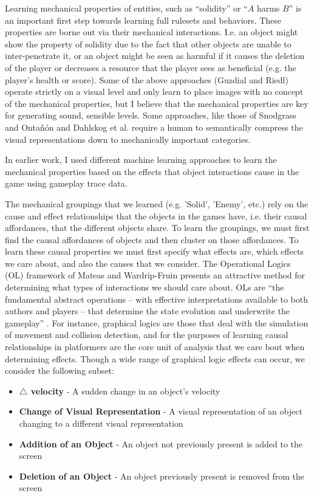 \documentclass[12pt]{report}
\begin{document}
Learning mechanical properties of entities, such as ``solidity'' or ``$A$ harms $B$'' is an important first step towards learning full rulesets and behaviors. These properties are borne out via their mechanical interactions.  I.e. an object might show the property of solidity due to the fact that other objects are unable to inter-penetrate it, or an object might be seen as harmful if it causes the deletion of the player or decreases a resource that the player sees as beneficial (e.g. the player's health or score).  Some of the above approaches (Guzdial and Riedl) operate strictly on a visual level and only learn to place images with no concept of the mechanical properties, but I believe that the mechanical properties are key for generating sound, sensible levels.  Some approaches, like those of Snodgrass and Onta{\~n}{\'o}n and Dahlskog et al. require a human to semantically compress the visual representations down to mechanically important categories.  

In earlier work, I used different machine learning approaches to  learn the mechanical properties based on the effects that object interactions cause in the game using gameplay trace data. 

 The mechanical groupings that we learned (e.g. 'Solid', 'Enemy', etc.) rely on the cause and effect relationships that the objects in the games have, i.e. their causal affordances, that the different objects share.  To learn the groupings, we must first find the causal affordances of objects and then cluster on those affordances.  To learn these causal properties we must first specify what effects are, which effects we care about, and also the causes that we consider.  The Operational Logics (OL) framework of Mateas and Wardrip-Fruin \cite{OperationalLogics} presents an attractive method for determining what types of interactions we should care about.  OLs are ``the fundamental abstract operations -- with effective interpretations available to both authors and players -- that determine the state evolution and underwrite the gameplay'' \cite{OperationalLogics}.  For instance, graphical logics are those that deal with the simulation of movement and collision detection, and for the purposes of learning causal relationships in platformers are the core unit of analysis that we care bout when determining effects. Though a wide range of graphical logic effects can occur, we consider the following subset:
 
\begin{itemize}
\item \textbf{$\triangle$ velocity} - A sudden change in an object's velocity
\item  \textbf{Change of Visual Representation} - A visual representation of an object changing to a different visual representation
\item \textbf{Addition of an Object} - An object not previously present is added to the screen
\item \textbf{Deletion of an Object} - An object previously present is removed from the screen
\end{itemize} 
\end{document}
